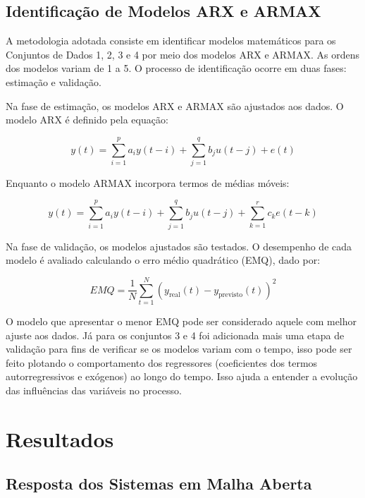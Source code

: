 \documentclass[a4paper,12pt]{article}
\begin{document}
\subsection{Identificação de Modelos ARX e ARMAX}\label{3.7}

A metodologia adotada consiste em identificar modelos matemáticos para os Conjuntos de Dados 1, 2, 3 e 4 por meio dos modelos ARX e ARMAX. As ordens dos modelos variam de 1 a 5. O processo de identificação ocorre em duas fases: estimação e validação.

Na fase de estimação, os modelos ARX e ARMAX são ajustados aos dados. O modelo ARX é definido pela equação:

\begin{equation*}\label{3.7.1}
    y(t) = \sum_{i=1}^{p} a_i y(t-i) + \sum_{j=1}^{q} b_j u(t-j) + e(t) \tag{3.7.1}
\end{equation*}

Enquanto o modelo ARMAX incorpora termos de médias móveis:

\begin{equation*}\label{3.7.2}
    y(t) = \sum_{i=1}^{p} a_i y(t-i) + \sum_{j=1}^{q} b_j u(t-j) + \sum_{k=1}^{r} c_k e(t-k) \tag{3.7.2}
\end{equation*}

Na fase de validação, os modelos ajustados são testados. O desempenho de cada modelo é avaliado calculando o erro médio quadrático (EMQ), dado por:

\begin{equation}
    EMQ = \frac{1}{N} \sum_{t=1}^{N} (y_{\text{real}}(t) - y_{\text{previsto}}(t))^2 \tag{3.7.3}
\end{equation}

O modelo que apresentar o menor EMQ pode ser considerado aquele com melhor ajuste aos dados. Já para os conjuntos 3 e 4 foi adicionada mais uma etapa de validação para fins de verificar se os modelos variam com o tempo, isso pode ser feito plotando o comportamento dos regressores (coeficientes dos termos autorregressivos e exógenos) ao longo do tempo. Isso ajuda a entender a evolução das influências das variáveis no processo.

\newpage
\section{Resultados}

\subsection{Resposta dos Sistemas em Malha Aberta}\label{4.1}
\end{document}
